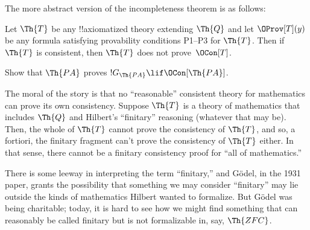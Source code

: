 \documentclass[../../../include/open-logic-section]{subfiles}
\begin{document}
The more abstract version of the incompleteness theorem is as follows:

\begin{thm}
 Let $\Th{T}$ be any
!!{axiomatized} theory extending $\Th{Q}$ and let $\OProv[T](y)$ be
any formula satisfying provability conditions P1--P3 for
$\Th{T}$. Then if $\Th{T}$ is consistent, then $\Th{T}$ does not
prove~$\OCon[T]$.
\end{thm}

\begin{prob}
Show that $\Th{PA}$ proves $!G_{\Th{PA}} \lif \OCon[\Th{PA}]$.
\end{prob}

\begin{digress}
The moral of the story is that no ``reasonable'' consistent theory for
mathematics can prove its own consistency. Suppose $\Th{T}$ is a
theory of mathematics that includes $\Th{Q}$ and Hilbert's
``finitary'' reasoning (whatever that may be). Then, the whole of
$\Th{T}$ cannot prove the consistency of $\Th{T}$, and so, a fortiori,
the finitary fragment can't prove the consistency of $\Th{T}$
either. In that sense, there cannot be a finitary consistency proof
for ``all of mathematics.''

There is some leeway in interpreting the term ``finitary,'' and G\"odel, in
the 1931 paper, grants the possibility that something we may consider
``finitary'' may lie outside the kinds of mathematics Hilbert wanted
to formalize. But G\"odel was being charitable; today, it is hard to
see how we might find something that can reasonably be called finitary
but is not formalizable in, say, $\Th{ZFC}$.
\end{digress}
\end{document}
